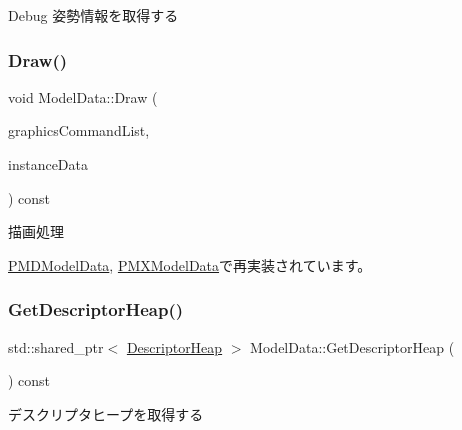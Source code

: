 Debug 姿勢情報を取得する \mbox{\label{class_model_data_a774032c8dac7355ad2657c83cf0d1e21}} 
\subsubsection{\texorpdfstring{Draw()}{Draw()}}
{\footnotesize\ttfamily void Model\+Data\+::\+Draw (\begin{DoxyParamCaption}\item[{Com\+Ptr$<$ I\+D3\+D12\+Graphics\+Command\+List $>$}]{graphics\+Command\+List,  }\item[{const \mbox{\hyperlink{struct_instance_data}{Instance\+Data}} \&}]{instance\+Data }\end{DoxyParamCaption}) const\hspace{0.3cm}{\ttfamily [virtual]}}



描画処理 



\mbox{\hyperlink{class_p_m_d_model_data_ae811d49854ae659f20ac9be60a5fb146}{P\+M\+D\+Model\+Data}}, \mbox{\hyperlink{class_p_m_x_model_data_aa88713736e3c337cabb23127c03be3c2}{P\+M\+X\+Model\+Data}}で再実装されています。

\mbox{\label{class_model_data_a7b30fc0bbceb348a615241b4fd333515}} 
\subsubsection{\texorpdfstring{Get\+Descriptor\+Heap()}{GetDescriptorHeap()}}
{\footnotesize\ttfamily std\+::shared\+\_\+ptr$<$ \mbox{\hyperlink{class_descriptor_heap}{Descriptor\+Heap}} $>$ Model\+Data\+::\+Get\+Descriptor\+Heap (\begin{DoxyParamCaption}{ }\end{DoxyParamCaption}) const}



デスクリプタヒープを取得する 

\mbox{\label{class_model_data_a4b0d36d5d77479dc7d08977aded2bc94}} 
